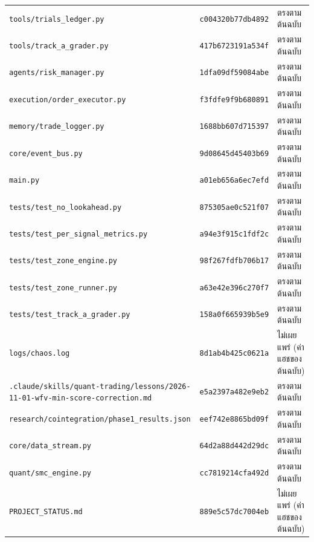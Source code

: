 {\begin{longtable}{@{}>{\raggedright\arraybackslash}p{8.6cm}p{2.7cm}>{\raggedright\arraybackslash}p{3.4cm}@{}}
\texttt{tools/\allowbreak{}trials\_ledger.py} & \texttt{c004320b77db4892} & ตรงตามต้นฉบับ \\
\texttt{tools/\allowbreak{}track\_a\_grader.py} & \texttt{417b6723191a534f} & ตรงตามต้นฉบับ \\
\texttt{agents/\allowbreak{}risk\_manager.py} & \texttt{1dfa09df59084abe} & ตรงตามต้นฉบับ \\
\texttt{execution/\allowbreak{}order\_executor.py} & \texttt{f3fdfe9f9b680891} & ตรงตามต้นฉบับ \\
\texttt{memory/\allowbreak{}trade\_logger.py} & \texttt{1688bb607d715397} & ตรงตามต้นฉบับ \\
\texttt{core/\allowbreak{}event\_bus.py} & \texttt{9d08645d45403b69} & ตรงตามต้นฉบับ \\
\texttt{main.py} & \texttt{a01eb656a6ec7efd} & ตรงตามต้นฉบับ \\
\texttt{tests/\allowbreak{}test\_no\_lookahead.py} & \texttt{875305ae0c521f07} & ตรงตามต้นฉบับ \\
\texttt{tests/\allowbreak{}test\_per\_signal\_metrics.py} & \texttt{a94e3f915c1fdf2c} & ตรงตามต้นฉบับ \\
\texttt{tests/\allowbreak{}test\_zone\_engine.py} & \texttt{98f267fdfb706b17} & ตรงตามต้นฉบับ \\
\texttt{tests/\allowbreak{}test\_zone\_runner.py} & \texttt{a63e42e396c270f7} & ตรงตามต้นฉบับ \\
\texttt{tests/\allowbreak{}test\_track\_a\_grader.py} & \texttt{158a0f665939b5e9} & ตรงตามต้นฉบับ \\
\texttt{logs/\allowbreak{}chaos.log} & \texttt{8d1ab4b425c0621a} & ไม่เผยแพร่ (ค่าแฮชของต้นฉบับ) \\
\texttt{.claude/\allowbreak{}skills/\allowbreak{}quant-\allowbreak{}trading/\allowbreak{}lessons/\allowbreak{}2026-\allowbreak{}11-\allowbreak{}01-\allowbreak{}wfv-\allowbreak{}min-\allowbreak{}score-\allowbreak{}correction.md} & \texttt{e5a2397a482e9eb2} & ตรงตามต้นฉบับ \\
\texttt{research/\allowbreak{}cointegration/\allowbreak{}phase1\_results.json} & \texttt{eef742e8865bd09f} & ตรงตามต้นฉบับ \\
\texttt{core/\allowbreak{}data\_stream.py} & \texttt{64d2a88d442d29dc} & ตรงตามต้นฉบับ \\
\texttt{quant/\allowbreak{}smc\_engine.py} & \texttt{cc7819214cfa492d} & ตรงตามต้นฉบับ \\
\texttt{PROJECT\_STATUS.md} & \texttt{889e5c57dc7004eb} & ไม่เผยแพร่ (ค่าแฮชของต้นฉบับ) \\
\bottomrule
\end{longtable}
}

